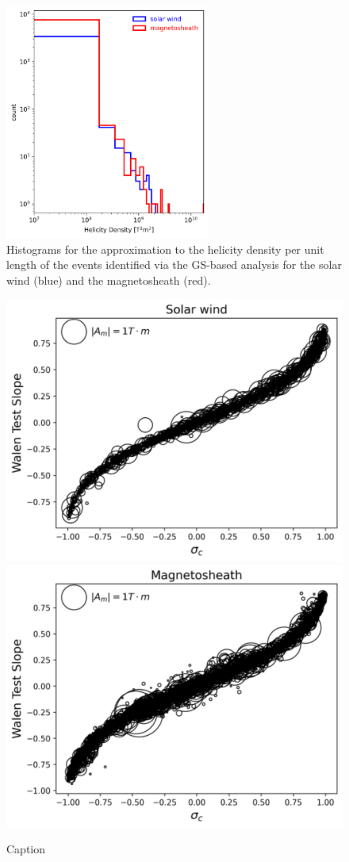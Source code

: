 \begin{figure}
    \centering
    \includegraphics[width=0.6\textwidth]{Figures/Histograms/histogram_helicitydensity.png}
    \caption[Histograms for the approximation to the helicity density per unit length]{Histograms for the approximation to the helicity density per unit length of the events identified via the GS-based analysis for the solar wind (blue) and the magnetosheath (red).}
    \label{fig:histogram-helicitydensity}
\end{figure}

\begin{figure}
    \centering
    \includegraphics[width=0.45\linewidth]{Figures/GS analysis/walenTest_vs_crosshelicity_solarwind.png}
    \includegraphics[width=0.45\linewidth]{Figures/GS analysis/walenTest_vs_crosshelicity_magnetosheath.png}
    \caption[Wal\'en test slope vs. reduced cross helicity]{Caption}
    \label{fig:walen-crosshelicity}
\end{figure}


